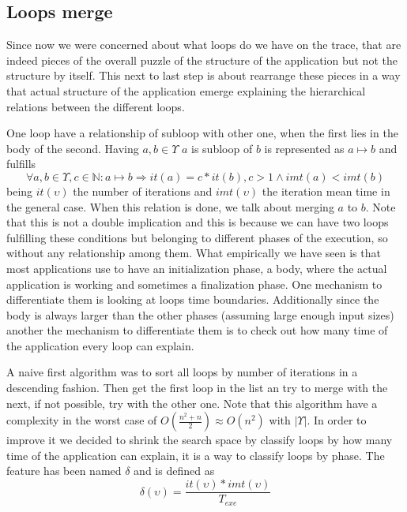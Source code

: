 \subsection{Loops merge}\label{ss:loops_merge}

Since now we were concerned about what loops do we have on the trace, that are
indeed pieces of the overall puzzle of the structure of the application but not
the structure by itself. This next to last step is about rearrange these pieces 
in a way that actual structure of the application emerge explaining the 
hierarchical relations between the different loops. 

One loop have a relationship of subloop with other one, when the first lies in
the body of the second. Having $a,b \in \Upsilon$ $a$ is subloop of $b$ is 
represented as $a \mapsto b$ and fulfills 
\begin{equation}
  \label{eq:subloop_rel_imp}
  \forall a,b \in \Upsilon, c \in \mathbb{N} : a \mapsto b \Rightarrow it(a) = c*it(b), c > 1 \land 
imt(a) < imt(b)
\end{equation}
being $it(\upsilon)$ the number of iterations and $imt(\upsilon)$ the iteration
mean time in the general case. When this relation is done, we talk about merging
$a$ to $b$. Note that this is not a double implication and
this is because we can have two loops fulfilling these conditions but belonging
to different phases of the execution, so without any relationship among them. 
What empirically we have seen is that most applications use to have an 
initialization phase, a body, where the actual application is working and 
sometimes a finalization phase. One mechanism to differentiate them is looking
at loops time boundaries. Additionally since the body is always larger than the
other phases (assuming large enough input sizes) another the mechanism to 
differentiate them is to check out how many time of the application every loop
can explain. 

A naive first algorithm was to sort all loops by number of iterations in a
descending fashion. Then get the first loop in the list an try to merge with the
next, if not possible, try with the other one. Note that this algorithm have a
complexity in the worst case of $O(\frac{n^{2}+n}{2}) \approx O(n^{2})$ with
$|\Upsilon|$. In order to improve it we decided to shrink the search space by
classify loops by how many time of the application can explain, it is a way to
classify loops by phase. The feature has been named $\delta$ and is defined as
$$
\delta(\upsilon)=\frac{it(\upsilon)*imt(\upsilon)}{T_{exe}}
$$

